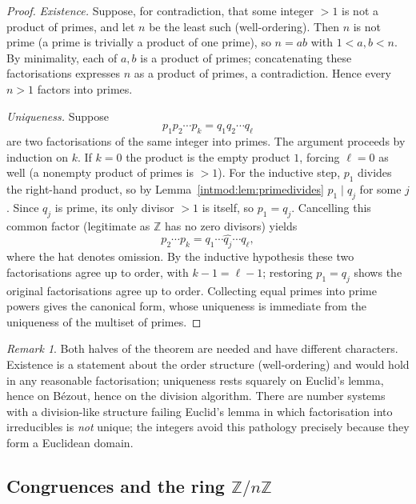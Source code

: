 \documentclass[11pt,a4paper]{article}
\theoremstyle{definition}
\theoremstyle{remark}
\newtheorem{remark}[theorem]{Remark}
\newcommand{\Z}{\ensuremath{\mathbb{Z}}}
\begin{document}
\begin{proof}
\emph{Existence.} Suppose, for contradiction, that some integer \(>1\) is not a product of primes, and let \(n\) be the least such (well-ordering). Then \(n\) is not prime (a prime is trivially a product of one prime), so \(n=ab\) with \(1<a,b<n\). By minimality, each of \(a,b\) is a product of primes; concatenating these factorisations expresses \(n\) as a product of primes, a contradiction. Hence every \(n>1\) factors into primes.

\emph{Uniqueness.} Suppose
\[
p_1 p_2 \cdots p_k = q_1 q_2 \cdots q_\ell
\]
are two factorisations of the same integer into primes. The argument proceeds by induction on \(k\). If \(k=0\) the product is the empty product \(1\), forcing \(\ell=0\) as well (a nonempty product of primes is \(>1\)). For the inductive step, \(p_1\) divides the right-hand product, so by Lemma~\ref{intmod:lem:primedivides} \(p_1\mid q_j\) for some \(j\). Since \(q_j\) is prime, its only divisor \(>1\) is itself, so \(p_1=q_j\). Cancelling this common factor (legitimate as \(\Z\) has no zero divisors) yields
\[
p_2\cdots p_k = q_1\cdots \widehat{q_j}\cdots q_\ell,
\]
where the hat denotes omission. By the inductive hypothesis these two factorisations agree up to order, with \(k-1=\ell-1\); restoring \(p_1=q_j\) shows the original factorisations agree up to order. Collecting equal primes into prime powers gives the canonical form, whose uniqueness is immediate from the uniqueness of the multiset of primes.
\end{proof}

\begin{remark}\label{intmod:rem:ftaroles}
Both halves of the theorem are needed and have different characters. Existence is a statement about the order structure (well-ordering) and would hold in any reasonable factorisation; uniqueness rests squarely on Euclid's lemma, hence on Bézout, hence on the division algorithm. There are number systems with a division-like structure failing Euclid's lemma in which factorisation into irreducibles is \emph{not} unique; the integers avoid this pathology precisely because they form a Euclidean domain.
\end{remark}

\subsection{Congruences and the ring \texorpdfstring{\(\Z/n\Z\)}{Z/nZ}}\label{intmod:sub:congruences}
\end{document}
